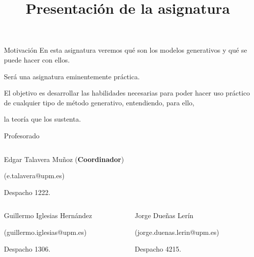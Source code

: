 



\title{Presentación de la asignatura}


\maketitle

\begin{frame}{Motivación}
En esta asignatura veremos qué son los \alert{modelos generativos} y qué se puede hacer con ellos.

Será una asignatura eminentemente \alert{práctica}.

El objetivo es desarrollar las habilidades necesarias para poder hacer uso práctico de cualquier tipo de método generativo, entendiendo, para ello,

\centering
\alert{\huge la teoría que los sustenta}.
\end{frame}

\begin{frame}{Profesorado}

\begin{columns}[T]
\begin{column}{.98\textwidth}
\centering
\alert{\Large Edgar Talavera Muñoz (\textbf{Coordinador})}

({\color{blue}e.talavera@upm.es})

Despacho 1222.
\end{column}
\end{columns}

\hfill

\begin{columns}[T]
\begin{column}{.49\textwidth}
\alert{\Large Guillermo Iglesias Hernández}

({\color{blue}guillermo.iglesias@upm.es})

Despacho 1306.
\end{column}
\hfill
\begin{column}{.49\textwidth}
\alert{\Large Jorge Dueñas Lerín}

({\color{blue}jorge.duenas.lerin@upm.es})

Despacho 4215.
\end{column}
\end{columns}
\end{frame}


